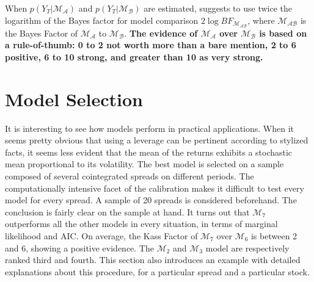 \documentclass[11pt,a4,twosided,singlespacing,titlepagenumber=on]{scrreprt}
\numberwithin{equation}{chapter} %
\theoremstyle{remark}
\begin{document}
When $p(Y_T | \mathcal{M_A})$ and $p(Y_T | \mathcal{M_B})$ are estimated, \cite{kass1995} suggests to use twice the logarithm of the Bayes factor for model comparison $2 \log BF_{\mathcal{M_{AB}}}$, where $\mathcal{M_{AB}}$ is the Bayes Factor of $\mathcal{M_A}$ to $\mathcal{M_B}$. \textbf{The evidence of $\mathcal{M_A}$ over $\mathcal{M_B}$ is based on a rule-of-thumb: 0 to 2 not worth more than a bare mention, 2 to 6 positive, 6 to 10 strong, and greater than 10 as very strong.}


\section{Model Selection}
It is interesting to see how models perform in practical applications. When it seems pretty obvious that using a leverage can be pertinent according to stylized facts, it seems less evident that the mean of the returns exhibits a stochastic mean proportional to its volatility. The best model is selected on a sample composed of several cointegrated spreads on different periods. The computationally intensive facet of the calibration makes it difficult to test every model for every spread. A sample of 20 spreads is considered beforehand. The conclusion is fairly clear on the sample at hand. It turns out that $\mathcal{M}_7$ outperforms all the other models in every situation, in terms of marginal likelihood and AIC. On average, the Kass Factor of $\mathcal{M}_7$ over $\mathcal{M}_6$ is between 2 and 6, showing a positive evidence. The $\mathcal{M}_2$ and $\mathcal{M}_3$ model are respectively ranked third and fourth. This section also introduces an example with detailed explanations about this procedure, for a particular spread and a particular stock.
\label{sec:model_selection}
\end{document}
